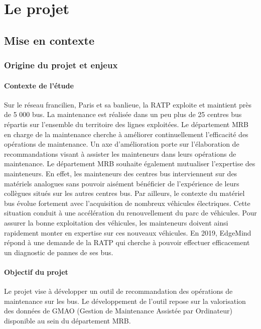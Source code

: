 \part{Le projet}
\chapter{Mise en contexte}

\section{Origine du projet et enjeux}

\subsection{Contexte de l'étude}

Sur le réseau francilien, Paris et sa banlieue, la RATP exploite et maintient près de 5 000 bus. La maintenance est réalisée dans un peu plus de 25 centres bus répartis sur l’ensemble du territoire des lignes exploitées.
Le département MRB en charge de la maintenance cherche à améliorer continuellement l’efficacité des opérations de maintenance. Un axe d’amélioration porte sur l’élaboration de recommandations visant à assister les mainteneurs dans leurs opérations de maintenance.
Le département MRB souhaite également mutualiser l’expertise des mainteneurs. En effet, les mainteneurs des centres bus interviennent sur des matériels analogues sans pouvoir aisément bénéficier de l’expérience de leurs collègues situés sur les autres centres bus.
Par ailleurs, le contexte du matériel bus évolue fortement avec l’acquisition de nombreux véhicules électriques. Cette situation conduit à une accélération du renouvellement du parc de véhicules. Pour assurer la bonne exploitation des véhicules, les mainteneurs doivent ainsi rapidement monter en expertise sur ces nouveaux véhicules.
En 2019, EdgeMind répond à une demande de la RATP qui cherche à pouvoir effectuer efficacement un diagnostic de pannes de ses bus.


\subsection{Objectif du projet}

Le projet vise à développer un outil de recommandation des opérations de maintenance sur les bus. Le développement de l’outil repose sur la valorisation des données de GMAO (Gestion de Maintenance Assistée par Ordinateur) disponible au sein du département MRB.

